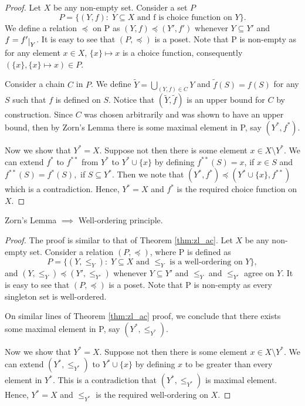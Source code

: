 \documentclass[11pt,a4paper]{article}
\begin{document}
\begin{proof}
    Let $X$ be any non-empty set. Consider a set $P$
    $$
        P = \{(Y,f):\;Y\subseteq X\text{ and f is choice function on }Y\}.
    $$
    We define a relation $\preccurlyeq$ on P as $(Y,f)\preccurlyeq (Y',f')$ whenever $Y\subseteq Y'$ and $f = f'\restrict{Y}$. It is easy to see that $(P,\preccurlyeq)$ is a poset. Note that P is non-empty as for any element $x\in X$, $\{x\} \mapsto x$ is a choice function, consequently $(\{x\},\{x\}\mapsto x)\in P$. 
    
    Consider a chain $C$ in $P$. We define $\tilde{Y} = \bigcup_{(Y,f)\in C}Y$ and $\tilde{f}(S) = f(S)$ for any $S$ such that $f$ is defined on $S$. Notice that $(\tilde{Y},\tilde{f})$ is an upper bound for $C$ by construction. Since $C$ was chosen arbitrarily and was shown to have an upper bound, then by Zorn's Lemma there is some maximal element in P, say $(Y^*,f^*)$. 
    
    Now we show that $Y^* = X$. Suppose not then there is some element $x\in X\setminus Y^*$. We can extend $f^*$ to $f^{**}$ from $Y^*$ to $Y^*\cup \{x\}$ by defining $f^{**}(S) = x$, if $x\in S$ and $f^{**}(S) = f^*(S),$ if $S\subseteq Y^*$. Then we note that $(Y^*,f^*)\preccurlyeq (Y^*\cup\{x\},f^{**})$ which is a contradiction. Hence, $Y^* = X$ and $f^*$ is the required choice function on $X$.
\end{proof}

\begin{theorem}
    Zorn's Lemma $\implies$ Well-ordering principle.
\end{theorem}

\begin{proof}
    The proof is similar to that of Theorem \ref{thm:zl_ac}. Let $X$ be any non-empty set. Consider a relation $(P,\preccurlyeq)$, where P is defined as 
    $$
        P = \{(Y,\le_Y):\;Y\subseteq X\text{ and }\le_Y\text{ is a well-ordering on }Y\},
    $$
    and $(Y,\le_Y) \preccurlyeq (Y',\le_{Y'})$ whenever $Y\subseteq Y'$ and $\le_Y$ and $\le_{Y'}$ agree on $Y$. It is easy to see that $(P,\preccurlyeq)$ is a poset. Note that P is non-empty as every singleton set is well-ordered.
    
    On similar lines of Theorem \ref{thm:zl_ac} proof, we conclude that there exists some maximal element in P, say $(Y^*,\le_{Y^*})$. 
    
    Now we show that $Y^* = X$. Suppose not then there is some element $x\in X\setminus Y^*$. We can extend $(Y^*,\le_{Y^*})$ to $Y^*\cup \{x\}$ by defining $x$ to be greater than every element in $Y^*$. This is a contradiction that $(Y^*,\le_{Y^*})$ is maximal element. Hence, $Y^* = X$ and $\le_{Y^*}$ is the required well-ordering on $X$.
\end{proof}
\end{document}
